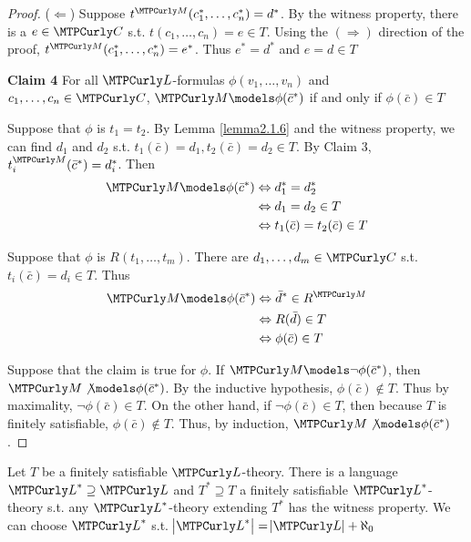 \documentclass[11pt]{article}
\begin{document}
\begin{proof}
(\(\Leftarrow\)) Suppose \(t^\calm(c_1^*,\dots,c_n^*)=d^*\). By the witness
property, there is a \(e\in\calc\) s.t. \(t(c_1,\dots,c_n)=e\in T\). Using the
\((\Rightarrow)\) direction of the proof, \(t^\calm(c_1^*,\dots,c_n^*)=e^*\).
Thus \(e^*=d^*\) and \(e=d\in T\)


\textbf{Claim 4} For all \(\call\)-formulas \(\phi(v_1,\dots,v_n)\) and
\(c_1,\dots,c_n\in\calc\), \(\calm\models\phi(\bar{c}^*)\) if and only if
\(\phi(\bar{c})\in T\)

Suppose that \(\phi\) is \(t_1=t_2\). By Lemma \ref{lemma2.1.6} and the
witness property, we can find \(d_1\) and \(d_2\) s.t. 
\(t_1(\bar{c})=d_1,t_2(\bar{c})=d_2\in T\). By Claim 3,
\(t_i^\calm(\bar{c}^*)=d_i^*\). Then
\begin{align*}
\calm\models\phi(\bar{c}^*)&\Leftrightarrow d_1^*=d_2^*\\
&\Leftrightarrow d_1=d_2\in T\\
&\Leftrightarrow t_1(\bar{c})=t_2(\bar{c})\in T
\end{align*}

Suppose that \(\phi\) is \(R(t_1,\dots,t_m)\). There are \(d_1,\dots,d_m\in\calc\)
s.t. \(t_i(\bar{c})=d_i\in T\). Thus
\begin{align*}
\calm\models\phi(\bar{c}^*)&\Leftrightarrow \bar{d}^*\in R^\calm\\
&\Leftrightarrow R(\bar{d})\in T\\
&\Leftrightarrow\phi(\bar{c})\in T
\end{align*}

Suppose that the claim is true for \(\phi\). If
\(\calm\models\neg\phi(\bar{c}^*)\), then
\(\calm\not\models\phi(\bar{c}^*)\). By the inductive hypothesis,
\(\phi(\bar{c})\not\in T\). Thus by maximality, \(\neg\phi(\bar{c})\in T\). On
the other hand, if \(\neg\phi(\bar{c})\in T\), then because \(T\) is finitely
satisfiable, \(\phi(\bar{c})\not\in T\). Thus, by induction,
\(\calm\not\models\phi(\bar{c}^*)\).
\end{proof}

\begin{lemma}[]
\label{lemma2.1.8}
Let \(T\) be a finitely satisfiable \(\call\)-theory. There is a language
\(\call^*\supseteq\call\) and \(T^*\supseteq T\) a finitely satisfiable
\(\call^*\)-theory s.t. any \(\call^*\)-theory extending \(T^*\) has the
witness property. We can choose \(\call^*\) s.t.
\(\abs{\call^*}=\abs{\call}+\aleph_0\) 
\end{lemma}
\end{document}
